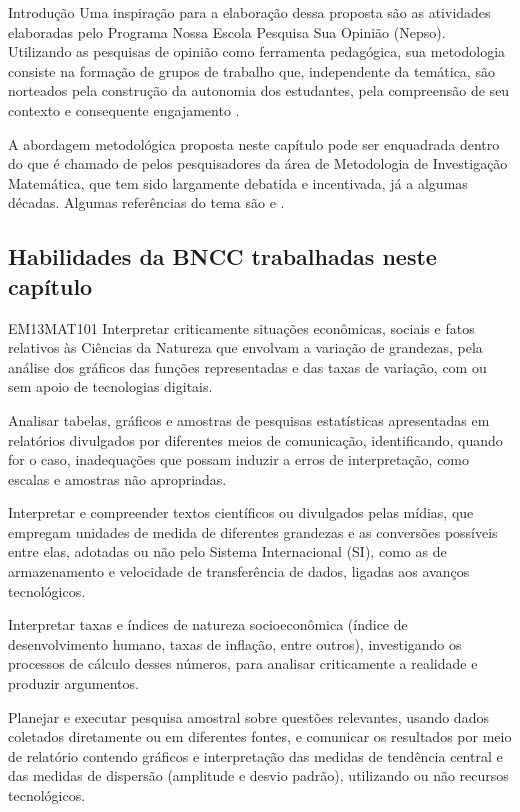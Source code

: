 \begin{apresentacao}{Introdução}
Uma inspiração para a elaboração dessa proposta são as atividades elaboradas pelo Programa Nossa Escola Pesquisa Sua Opinião (Nepso). Utilizando as pesquisas de opinião como ferramenta pedagógica, sua metodologia consiste na formação de grupos de trabalho que, independente da temática, são norteados pela construção da autonomia dos estudantes, pela compreensão de seu contexto e consequente engajamento \citep{andrade2014}.

A abordagem metodológica proposta neste capítulo pode ser enquadrada dentro do que é chamado de pelos pesquisadores da área de Metodologia de Investigação Matemática, que tem sido largamente debatida e incentivada, já a algumas décadas. Algumas referências do tema são \citet*{ponte2019} e \citet{dambrosio1993}. 

\columnbreak

\subsection{Habilidades da BNCC trabalhadas neste capítulo}
\begin{habilities}{EM13MAT101}
Interpretar criticamente situações econômicas, sociais e fatos relativos às Ciências da Natureza que envolvam a variação de grandezas, pela análise dos gráficos das funções representadas e das taxas de variação, com ou sem apoio de tecnologias digitais.

Analisar tabelas, gráficos e amostras de pesquisas estatísticas apresentadas em relatórios divulgados por diferentes meios de comunicação, identificando, quando for o caso, inadequações que possam induzir a erros de interpretação, como escalas e amostras não apropriadas. 

Interpretar e compreender textos científicos ou divulgados pelas mídias, que empregam unidades de medida de diferentes grandezas e as conversões possíveis entre elas, adotadas ou não pelo Sistema Internacional (SI), como as de armazenamento e velocidade de transferência de dados, ligadas aos avanços tecnológicos. 

Interpretar taxas e índices de natureza socioeconômica (índice de desenvolvimento humano, taxas de inflação, entre outros), investigando os processos de cálculo desses números, para analisar criticamente a realidade e produzir argumentos.

Planejar e executar pesquisa amostral sobre questões relevantes, usando dados coletados diretamente ou em diferentes fontes, e comunicar os resultados por meio de relatório contendo gráficos e interpretação das medidas de tendência central e das medidas de dispersão (amplitude e desvio padrão), utilizando ou não recursos tecnológicos.
\end{habilities}


\end{apresentacao}
